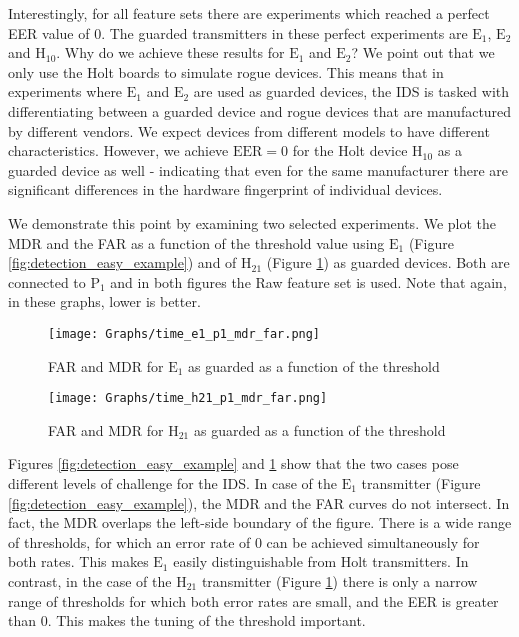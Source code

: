 \documentclass[compsoc,conference,a4paper,10pt,times]{IEEEtran}
\begin{document}
  Interestingly, for all feature sets there are experiments which reached a perfect EER value of 0. The guarded transmitters in these perfect experiments are \(\text{E}_1\), \(\text{E}_2\) and \(\text{H}_{10}\). Why do we achieve these results for \(\text{E}_1\) and \(\text{E}_2\)? We point out that we only use the Holt boards to simulate rogue devices. This means that in experiments where \(\text{E}_1\) and \(\text{E}_2\) are used as guarded devices, the IDS is tasked with differentiating between a guarded device and rogue devices that are manufactured by different vendors. We expect devices from different models to have different characteristics. However, we achieve \(\text{EER}=0\) for the Holt device \(\text{H}_{10}\) as a guarded device as well - indicating that even for the same manufacturer there are significant differences in the hardware fingerprint of individual devices.
  
  We demonstrate this point by examining two selected experiments. We plot the MDR and the FAR as a function of the threshold value using \(\text{E}_1\) (Figure \ref{fig:detection_easy_example}) and of \(\text{H}_{21}\) (Figure \ref{fig:detection_difficult_example}) as guarded devices. Both are connected to \(\text{P}_1\) and in both figures the Raw feature set is used. Note that again, in these graphs, lower is better.
  
  \begin{figure}[t]
    \centering
    \texttt{[image: Graphs/time\_e1\_p1\_mdr\_far.png]}
    \caption{FAR and MDR for \(\text{E}_1\) as guarded as a function of the threshold}
    \label{fig:detection_easy_example}
  
    \texttt{[image: Graphs/time\_h21\_p1\_mdr\_far.png]}
    \caption{FAR and MDR for \(\text{H}_{21}\) as guarded as a function of the threshold}
    \label{fig:detection_difficult_example}
  \end{figure}
  
  Figures \ref{fig:detection_easy_example} and \ref{fig:detection_difficult_example} show that the two cases pose different levels of challenge for the IDS.
  In case of the \(\text{E}_1\) transmitter (Figure \ref{fig:detection_easy_example}), the MDR and the FAR curves do not intersect. In fact, the MDR overlaps the left-side boundary of the figure. There is a wide range of thresholds, for which an error rate of 0 can be achieved simultaneously for both rates. This makes \(\text{E}_1\) easily distinguishable from Holt transmitters. In contrast, in the case of the \(\text{H}_{21}\) transmitter (Figure \ref{fig:detection_difficult_example}) there is only a narrow range of thresholds for which both error rates are small, and the EER is greater than 0. This makes the tuning of the threshold important.
  
\end{document}
